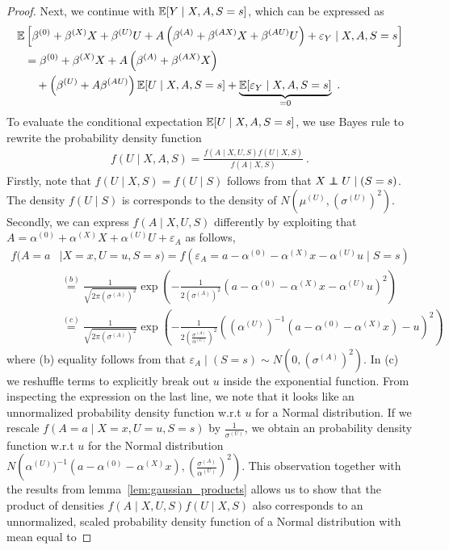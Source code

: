 \documentclass{article}
\begin{document}
\begin{proof}
    Next, we continue with $\mathbb{E}[Y\mid X, A, S=s]$, which can be expressed as
    \begin{equation} \label{eq:exp_Y_given_XAS}
        \begin{aligned}
        \mathbb{E}&\left[\beta^{(0)} + \beta^{(X)} X + \beta^{(U)} U + A  \left(\beta^{(A)} +  \beta^{(AX)} X + \beta^{(AU)} U \right) + \varepsilon_Y\mid X, A, S=s\right] \\
        & =  \beta^{(0)} + \beta^{(X)} X + A  \left(\beta^{(A)} + \beta^{(AX)} X\right) \\
         & \quad + \left(\beta^{(U)} + A \beta^{(AU)} \right)  \mathbb{E}[U\mid X, A, S=s] + \underbrace{\mathbb{E}[\varepsilon_Y\mid X, A, S=s]}_{=0}~.
         \end{aligned}
    \end{equation}
    To evaluate the conditional expectation $\mathbb{E}[U\mid X, A, S=s]$, we use Bayes rule to rewrite the probability density function 
    \begin{align*}
        f(U\mid X, A, S) = \frac{f(A\mid X, U, S) f(U\mid X, S)}{f(A\mid X, S)}~.
    \end{align*}
    Firstly, note that $f(U\mid X, S)=f(U\mid S)$ follows from that $X \indep U \mid (S=s)$. The density $f(U\mid S)$ is corresponds to the density of $N(\mu^{(U)}, (\sigma^{(U)})^2)$. Secondly, we can express $f(A\mid X, U, S)$ differently by exploiting that $A=\alpha^{(0)} + \alpha^{(X)} X + \alpha^{(U)} U + \varepsilon_A$ as follows,
    \begin{align*}
        f(A=a &\mid X=x, U=u, S=s)  = f(\varepsilon_A= a - \alpha^{(0)} - \alpha^{(X)} x  - \alpha^{(U)}  u \mid S=s) \\
        & \overset{(b)}{=} \frac{1}{\sqrt{2\pi(\sigma^{(A)})^2}} \exp \left(-\frac{1}{2(\sigma^{(A)})^2} (a - \alpha^{(0)} - \alpha^{(X)} x  - \alpha^{(U)}  u)^2 \right) \\
        & \overset{(c)}{=} \frac{1}{\sqrt{2\pi(\sigma^{(A)})^2}} \exp \left(-\frac{1}{2\left(\frac{\sigma^{(A)}}{\alpha^{(U)}}\right)^2} \left( (\alpha^{(U)})^{-1} \left(a - \alpha^{(0)} - \alpha^{(X)} x\right) - u\right)^2 \right)
    \end{align*}
    where (b) equality follows from that $\varepsilon_A \mid (S=s) \sim N(0, (\sigma^{(A)})^2)$. In (c) we reshuffle terms to explicitly break out $u$ inside the exponential function. From inspecting the expression on the last line, we note that it looks like an unnormalized probability density function w.r.t $u$ for a Normal distribution. If we rescale $f(A=a \mid X=x, U=u, S=s)$ by $\frac{1}{\sigma^{(U)}}$, we obtain an probability density function w.r.t $u$ for the Normal distribution $N\left (\alpha^{(U)})^{-1} \left(a - \alpha^{(0)} - \alpha^{(X)} x \right), \left(\frac{\sigma^{(A)}}{\alpha^{(U)}}\right)^2 \right)$. This observation together with the results from lemma~\ref{lem:gaussian_products} allows us to show that the product of densities $f(A\mid X, U, S) f(U\mid X, S)$ also corresponds to an unnormalized, scaled probability density function of a Normal distribution with mean equal to

\end{proof}
\end{document}
